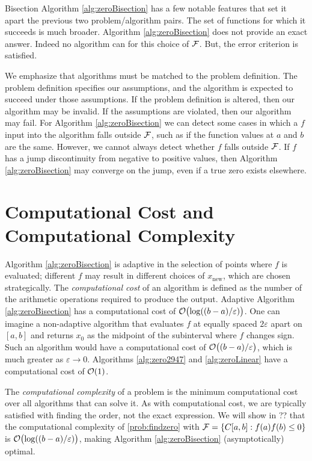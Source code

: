 Bisection Algorithm \ref{alg:zeroBisection} has a few notable features that set it apart the previous two problem/algorithm pairs.  The set of functions for which it succeeds is much broader.  Algorithm \ref{alg:zeroBisection} does not provide an exact answer.  Indeed no algorithm can for this choice of $\mathcal{F}$. But, the error criterion is satisfied. 

We emphasize that algorithms must be matched to the problem definition.  The problem definition specifies our assumptions, and the algorithm is expected to succeed under those assumptions.  If the problem definition is altered, then our algorithm may be invalid.  If the assumptions are violated, then our algorithm may fail.  For Algorithm \ref{alg:zeroBisection} we can detect some cases in which a $f$ input into the algorithm falls outside $\mathcal{F}$, such as if the function values at $a$ and $b$ are the same.  However, we cannot always detect whether $f$ falls outside $\mathcal{F}$.  If $f$ has a jump discontinuity from negative to positive values, then Algorithm \ref{alg:zeroBisection} may converge on the jump, even if a true zero exists elsewhere.

\section{Computational Cost and Computational Complexity}

Algorithm \ref{alg:zeroBisection} is adaptive in the selection of points where $f$ is evaluated; different $f$ may result in different choices of $x_{\text{new}}$, which are chosen strategically. The \emph{computational cost} of an algorithm is defined as the number of the arithmetic operations required to produce the output.  Adaptive Algorithm \ref{alg:zeroBisection} has a computational cost of $\operatorname{{\mathcal O}}\bigl(\log((b-a)/\varepsilon)\bigr)$.  One can imagine a non-adaptive algorithm that evaluates $f$ at  equally spaced $2\varepsilon$ apart on $[a,b]$ and returns $x_0$ as the midpoint of the subinterval where $f$ changes sign.  Such an algorithm would have a computational cost of $\operatorname{{\mathcal O}}\bigl((b-a)/\varepsilon\bigr)$, which is much greater as $\varepsilon \to 0$.   Algorithms \ref{alg:zero2947} and  \ref{alg:zeroLinear} have a computational cost of $\operatorname{{\mathcal O}}(1)$.

The \emph{computational complexity} of a problem is the minimum computational cost over all algorithms that can solve it.  As with computational cost, we are typically satisfied with finding the order, not the exact expression.  We will show in ?? that the computational complexity of \ref{prob:findzero} with $\mathcal{F} = \{C[a,b] : f(a)f(b) \le 0\}$ is $\operatorname{{\mathcal O}}\bigl(\log((b-a)/\varepsilon)\bigr)$, making Algorithm \ref{alg:zeroBisection} (asymptotically) optimal.

